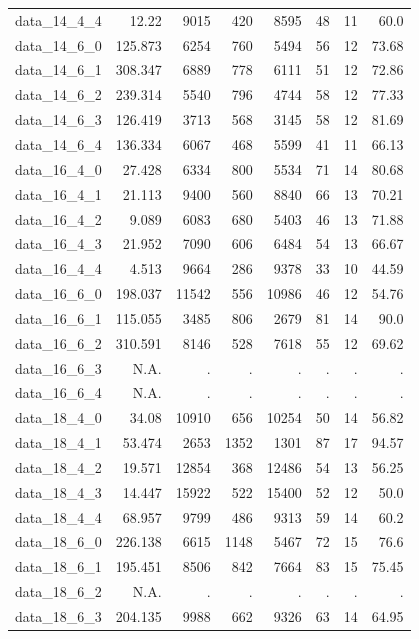 \documentclass[preprint,12pt,authoryear]{elsarticle}
\begin{document}
\begin{table}[h!]
{\begin{tabular}{rrrrrrrr}
  data\_14\_4\_4 & 12.22 & 9015 & 420 & 8595 & 48 & 11 & 60.0 \\
  data\_14\_6\_0 & 125.873 & 6254 & 760 & 5494 & 56 & 12 & 73.68 \\
  data\_14\_6\_1 & 308.347 & 6889 & 778 & 6111 & 51 & 12 & 72.86 \\
  data\_14\_6\_2 & 239.314 & 5540 & 796 & 4744 & 58 & 12 & 77.33 \\
  data\_14\_6\_3 & 126.419 & 3713 & 568 & 3145 & 58 & 12 & 81.69 \\
  data\_14\_6\_4 & 136.334 & 6067 & 468 & 5599 & 41 & 11 & 66.13 \\
  data\_16\_4\_0 & 27.428 & 6334 & 800 & 5534 & 71 & 14 & 80.68 \\
  data\_16\_4\_1 & 21.113 & 9400 & 560 & 8840 & 66 & 13 & 70.21 \\
  data\_16\_4\_2 & 9.089 & 6083 & 680 & 5403 & 46 & 13 & 71.88 \\
  data\_16\_4\_3 & 21.952 & 7090 & 606 & 6484 & 54 & 13 & 66.67 \\
  data\_16\_4\_4 & 4.513 & 9664 & 286 & 9378 & 33 & 10 & 44.59 \\
  data\_16\_6\_0 & 198.037 & 11542 & 556 & 10986 & 46 & 12 & 54.76 \\
  data\_16\_6\_1 & 115.055 & 3485 & 806 & 2679 & 81 & 14 & 90.0 \\
  data\_16\_6\_2 & 310.591 & 8146 & 528 & 7618 & 55 & 12 & 69.62 \\
  data\_16\_6\_3 & N.A. & . & . & . & . & . & . \\
  data\_16\_6\_4 & N.A. & . & . & . & . & . & . \\
  data\_18\_4\_0 & 34.08 & 10910 & 656 & 10254 & 50 & 14 & 56.82 \\
  data\_18\_4\_1 & 53.474 & 2653 & 1352 & 1301 & 87 & 17 & 94.57 \\
  data\_18\_4\_2 & 19.571 & 12854 & 368 & 12486 & 54 & 13 & 56.25 \\
  data\_18\_4\_3 & 14.447 & 15922 & 522 & 15400 & 52 & 12 & 50.0 \\
  data\_18\_4\_4 & 68.957 & 9799 & 486 & 9313 & 59 & 14 & 60.2 \\
  data\_18\_6\_0 & 226.138 & 6615 & 1148 & 5467 & 72 & 15 & 76.6 \\
  data\_18\_6\_1 & 195.451 & 8506 & 842 & 7664 & 83 & 15 & 75.45 \\
  data\_18\_6\_2 & N.A. & . & . & . & . & . & . \\
  data\_18\_6\_3 & 204.135 & 9988 & 662 & 9326 & 63 & 14 & 64.95 \\

\end{tabular}}
\end{table}
\end{document}
